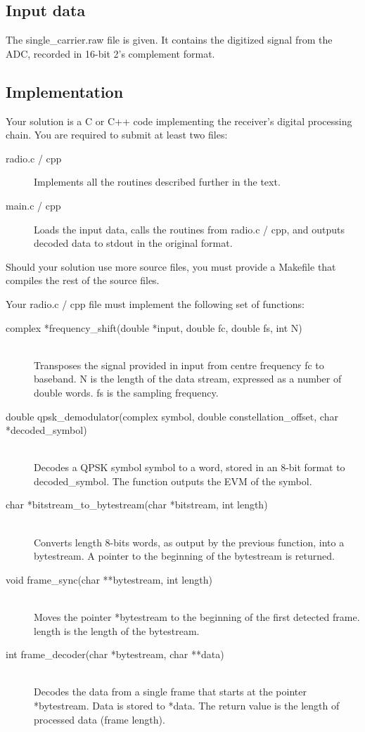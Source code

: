 \documentclass[a4paper]{article}
\begin{document}
\subsection*{Input data}
The \textsf{single\_carrier.raw} file is given. It contains the digitized signal from the ADC, recorded in 16-bit 2's complement format.

\subsection*{Implementation}
Your solution is a C or C++ code implementing the receiver's digital processing chain. You are required to submit at least two files:
\begin{description}
	\item[radio.c / cpp] Implements all the routines described further in the text.
	\item[main.c / cpp] Loads the input data, calls the routines from \textsf{radio.c / cpp}, and outputs decoded data to stdout in the original format.
\end{description}
Should your solution use more source files, you must provide a \textsf{Makefile} that compiles the rest of the source files.

Your radio.c / cpp file must implement the following set of functions:
\begin{description}
	\item[complex *frequency\_shift(double *input, double fc, double fs, int N)]
	\,\\ Transposes the signal provided in input from centre frequency \textsf{fc} to baseband. \textsf{N} is the length of the data stream, expressed as a number of double words. \textsf{fs} is the sampling frequency.
	\item[double qpsk\_demodulator(complex symbol, double constellation\_offset, char *decoded\_symbol)]
	\,\\ Decodes a QPSK symbol \textsf{symbol} to a word, stored in an 8-bit format to \textsf{decoded\_symbol}. The function outputs the EVM of the symbol.
	\item[char *bitstream\_to\_bytestream(char *bitstream, int length)]
	\,\\ Converts \textsf{length} 8-bits words, as output by the previous function, into a bytestream. A pointer to the beginning of the bytestream is returned.
	\item[void frame\_sync(char **bytestream, int length)]
	\,\\ Moves the pointer \textsf{*bytestream} to the beginning of the first detected frame. \textsf{length} is the length of the bytestream.
	\item[int frame\_decoder(char *bytestream, char **data)]
	\,\\ Decodes the data from a single frame that starts at the pointer \textsf{*bytestream}. Data is stored to \textsf{*data}. The return value is the length of processed data (frame length).
\end{description}
\end{document}
